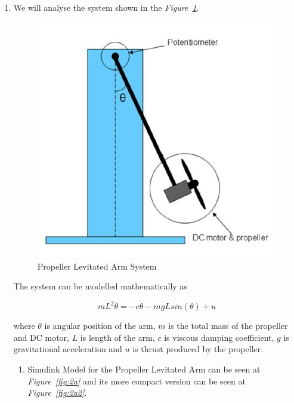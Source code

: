 \documentclass[a4paper,12pt]{article}
\begin{document}
\begin{enumerate}
	
	\item We will analyse the system shown in the \textit{Figure~\ref{fig:2}}.
				\begin{figure}[H]
					\center
					\setlength{\unitlength}{\textwidth} 
					\includegraphics[width=0.4\unitlength]{images/2}
					\caption{\label{fig:2} Propeller Levitated Arm  System }
				\end{figure}	
				
	
	The system can be modelled mathematically as

		$$	mL^2\ddot{\theta}=-c\dot{\theta}-mgLsin(\theta)+u	$$	
	
	where $\theta$ is angular position of the arm, $m$ is the total mass of the propeller and DC motor, $L$ is length of the arm, $c$ is viscous damping coefficient, $g$ is gravitational acceleration and $u$ is thrust produced by the propeller.%
	

	
				
	
		\begin{enumerate}
			\item Simulink Model for the Propeller Levitated Arm can be seen at \textit{Figure~\ref{fig:2a}} and its more compact version can be seen at \textit{Figure~\ref{fig:2a2}}.			
			

\end{enumerate}
\end{enumerate}
\end{document}
